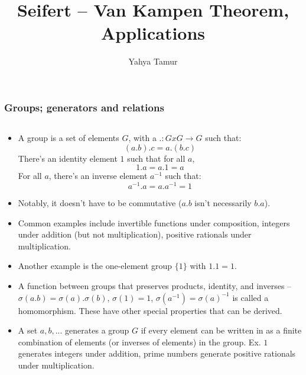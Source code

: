 \documentclass[8pt]{beamer}
\title{Seifert -- Van Kampen Theorem, Applications}
\author{Yahya Tamur}
\begin{document}
  \frame{\titlepage}
  \begin{frame}
    \frametitle{Groups; generators and relations}
    \begin{columns}
      \begin{column}[T]{0.5\textwidth}
        \begin{itemize}
          \item A group is a set of elements $G$, with a $. : GxG \rightarrow G$
            such that:
            \[(a.b).c = a.(b.c)\]
            There's an identity element $1$ such that for all $a$,
            \[1.a = a.1 = a\]
            For all $a$, there's an inverse element $a^{-1}$ such that:
            \[a^{-1}.a = a.a^{-1} = 1\]
          \item Notably, it doesn't have to be commutative ($a.b$ isn't
            necessarily $b.a$).\pause
          \item Common examples include invertible functions under composition,
            integers under addition (but not multiplication), positive rationals
            under multiplication.\pause
          \item Another example is the one-element group $\{1\}$ with $1.1 = 1$.
            \pause
          \item A function between groups that preserves products, identity, and
            inverses -- $\sigma(a.b) = \sigma(a).\sigma(b)$, $\sigma(1) = 1$,
            $\sigma(a^{-1}) = \sigma(a)^{-1}$ is called a homomorphism. These
            have other special properties that can be derived.\pause
          \item A set ${a,b,...}$ generates a group $G$ if every element can be
            written in as a finite combination of elements (or inverses of
            elements) in the group. Ex. ${1}$ generates integers under addition,
            prime numbers generate positive rationals under multiplication.
            \pause


\end{itemize}
\end{column}
\end{columns}
\end{frame}
\end{document}
